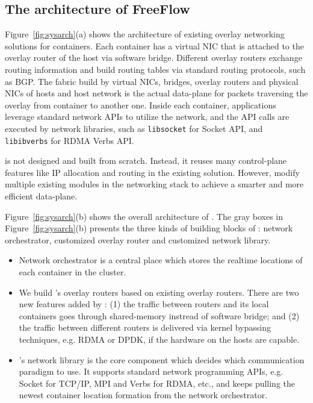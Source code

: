 \subsection{The architecture of FreeFlow}

Figure~\ref{fig:sysarch}(a) shows the architecture of existing overlay networking
solutions for containers. Each container has a virtual NIC that is attached to
the overlay router of the host via software bridge. Different overlay routers
exchange routing information and build routing tables via standard routing 
protocols, such as BGP. The fabric build by virtual NICs, bridges, overlay routers and physical NICs of hosts and host network is the actual data-plane for
packets traversing the overlay from container to another one. Inside each container, applications leverage standard network APIs to utilize the network, and the API calls are executed by network libraries, such as \texttt{libsocket} for Socket API, and \texttt{libibverbs} for RDMA Verbs API.

\sysname is not designed and built from scratch. Instead, it reuses many
control-plane features like IP allocation and routing in the existing solution.
However, \sysname modify multiple existing modules in the networking stack
to achieve a smarter and more efficient data-plane.

Figure~\ref{fig:sysarch}(b) shows the overall architecture of \sysname.
The gray boxes in Figure~\ref{fig:sysarch}(b) presents the three kinds of
building blocks of \sysname: network orchestrator, customized overlay router and
customized network library.
\begin{itemize}

\item Network orchestrator is a central place which stores the realtime locations
of each container in the cluster. 

\item We build \sysname's overlay routers based
on existing overlay routers. There are two new features added by \sysname:
(1) the traffic between routers and its local containers goes through shared-memory instread of software bridge; and (2) the traffic between different
routers is delivered via kernel bypassing techniques, e.g. RDMA or DPDK, if
the hardware on the hosts are capable.

\item \sysname's network library is the core component which decides which
communication paradigm to use. It supports standard network programming APIs,
e.g. Socket for TCP/IP, MPI and Verbs for RDMA, etc., and keeps pulling
the newest container location formation from the network orchestrator. 


\end{itemize} 

